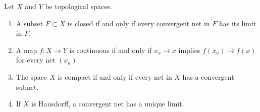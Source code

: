 \begin{proposition}\label{prop:net-criterion}
Let $X$ and $Y$ be topological spaces.
\begin{enumerate}
\item A subset $F\subset X$ is closed if and only if every convergent net in
  $F$ has its limit in $F$.
\item A map $f:X\to Y$ is continuous if and only if $x_a\to x$ implies
  $f(x_a)\to f(x)$ for every net $(x_a)$.
\item The space $X$ is compact if and only if every net in $X$ has a
  convergent subnet.
\item If $X$ is Hausdorff, a convergent net has a unique limit.
\end{enumerate}
\par
\end{proposition}


